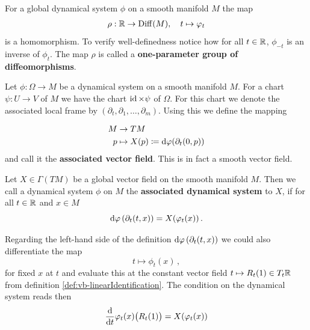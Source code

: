 \begin{corollary}
	For a global dynamical system $\phi$ on a smooth manifold $M$ the map
	\begin{align*}
		\rho: \mathbb{R} \to \operatorname{\mathrm{Diff}}(M),\quad t\mapsto \varphi_t
	\end{align*}is a homomorphism. To verify well-definedness notice how for all $t\in \mathbb{R}$, $\phi_{-t}$ is an inverse of $\phi_t$. The map $\rho$ is called a \textbf{one-parameter group of diffeomorphisms}.
\end{corollary}
\begin{definition}
	Let $\phi: \Omega \to M$ be a dynamical system on a smooth manifold $M$. For a chart $\psi:U\to V$ of $M$ we have the chart $\operatorname{\mathrm{id}}\times \psi$ of $\Omega$. For this chart we denote the associated local frame by $(\partial_t,\partial_1,\dots, \partial_m)$.  Using this we define the mapping
	
	\begin{align*}
		M &\to TM\\
		p& \mapsto X(p)\coloneq \mathop{}\!\mathrm{d} \varphi (\partial_t(0,p))
	\end{align*} and call it the \textbf{associated vector field}. This is in fact a smooth vector field. 
\end{definition}
\begin{definition}
	Let $X\in \Gamma(TM)$ be a global vector field on the smooth manifold $M$. Then we call a dynamical system $\phi$ on $M$ the \textbf{associated dynamical system} to $X$, if for all $t\in \mathbb{R}$ and $x\in M$ 
	\begin{equation*}
		\mathop{}\!\mathrm{d} \varphi \left(\partial_t(t,x )\right)=X(\varphi_{t}(x))\,.
	\end{equation*} 
\end{definition}
\begin{remark}
	Regarding the left-hand side of the definition $\mathop{}\!\mathrm{d} \varphi \left(\partial_t(t,x )\right)$ we could also differentiate the map 
	\begin{equation*}
		t \mapsto \phi_t(x)\,,
	\end{equation*} for fixed $x$ at $t$ and evaluate this at the constant vector field $t\mapsto R_t(1)\in T_t \mathbb{R}$ from definition \ref{def:vb-linearIdentification}. The condition on the dynamical system reads then
	\begin{equation*}
		\frac{\mathop{}\!\mathrm{d}}{\mathop{}\!\mathrm{d} t} \varphi_t(x)\big(R_t(1)\big)=X(\varphi_{t}(x))
	\end{equation*}
\end{remark}

